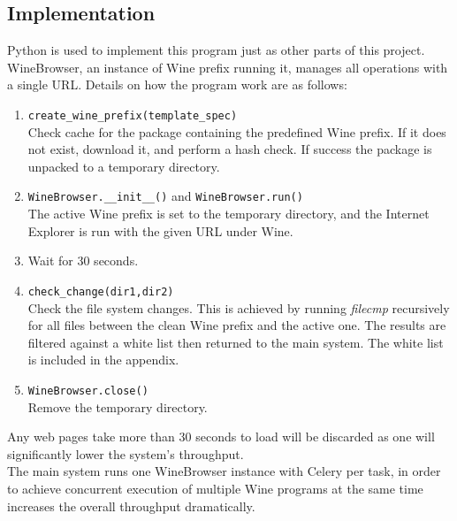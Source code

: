 \subsection{Implementation}
Python is used to implement this program just as other parts of this project. 
WineBrowser, an instance of Wine prefix running it, manages all operations 
with a single URL. Details on how the program work are as follows:
\begin{enumerate}
\item \verb`create_wine_prefix(template_spec)` \\
Check cache for the package containing the predefined Wine prefix. If it does
not exist, download it, and perform a hash check.
If success the package is unpacked to a temporary directory. 
\item \verb`WineBrowser.__init__()` and \verb`WineBrowser.run()`\\
The active Wine prefix is set to the temporary directory, and the Internet 
Explorer is run with the given URL under Wine. 
\item
Wait for 30 seconds.
\item \verb`check_change(dir1,dir2)`\\
Check the file system changes. This is achieved by running {\em filecmp} recursively 
for all files between the clean Wine prefix and the active one. The results 
are filtered against a white list then returned to the main system. The white 
list is included in the appendix.%
\item \verb`WineBrowser.close()`\\
Remove the temporary directory. 
\end{enumerate}
Any web pages take more than 30 seconds to 
load will be discarded as one will significantly lower the system's 
throughput. \\
The main system runs one WineBrowser instance with Celery per task, in order 
to achieve concurrent execution of multiple Wine programs at the same time increases the overall throughput dramatically. 

